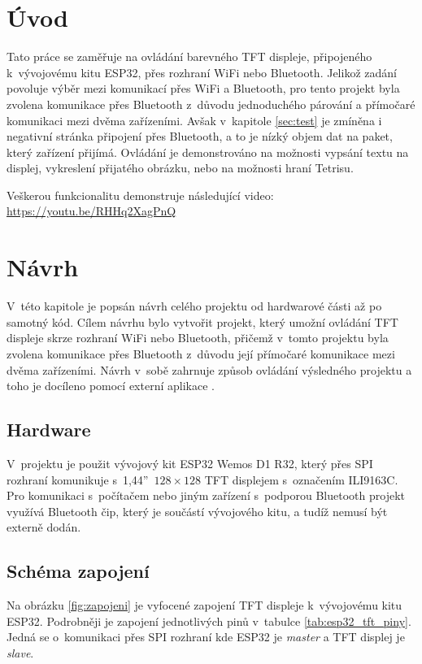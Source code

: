 \chapter{Úvod}

Tato práce se zaměřuje na ovládání barevného TFT displeje, připojeného k~vývojovému kitu ESP32, přes rozhraní WiFi nebo Bluetooth. Jelikož zadání povoluje výběr mezi komunikací přes WiFi a Bluetooth, pro tento projekt byla zvolena komunikace přes Bluetooth z~důvodu jednoduchého párování a přímočaré komunikaci mezi dvěma zařízeními. Avšak v~kapitole \ref{sec:test} je zmíněna i negativní stránka připojení přes Bluetooth, a to je nízký objem dat na paket, který zařízení přijímá. Ovládání je demonstrováno na možnosti vypsání textu na displej, vykreslení přijatého obrázku, nebo na možnosti hraní Tetrisu.

Veškerou funkcionalitu demonstruje následující video: \url{https://youtu.be/RHHq2XagPnQ}

\chapter{Návrh}

V~této kapitole je popsán návrh celého projektu od hardwarové části až po samotný kód. Cílem návrhu bylo vytvořit projekt, který umožní ovládání TFT displeje skrze rozhraní WiFi nebo Bluetooth, přičemž v~tomto projektu byla zvolena komunikace přes Bluetooth z~důvodu její přímočaré komunikace mezi dvěma zařízeními. Návrh v~sobě zahrnuje způsob ovládání výsledného projektu a toho je docíleno pomocí externí aplikace \cite{AppPixelBluetoothCanvas}.

\section{Hardware}

V~projektu je použit vývojový kit ESP32 Wemos D1 R32, který přes SPI rozhraní komunikuje s~1,44''~$128\times128$ TFT displejem s~označením ILI9163C.
Pro komunikaci s~počítačem nebo jiným zařízení s~podporou Bluetooth projekt využívá Bluetooth čip, který je součástí vývojového kitu, a tudíž nemusí být externě dodán.

\section{Schéma zapojení}

Na obrázku \ref{fig:zapojeni} je vyfocené zapojení TFT displeje k~vývojovému kitu ESP32. Podrobněji je zapojení jednotlivých pinů v~tabulce \ref{tab:esp32_tft_piny}. Jedná se o~komunikaci přes SPI rozhraní kde ESP32 je \textit{master} a TFT displej je \textit{slave}.

